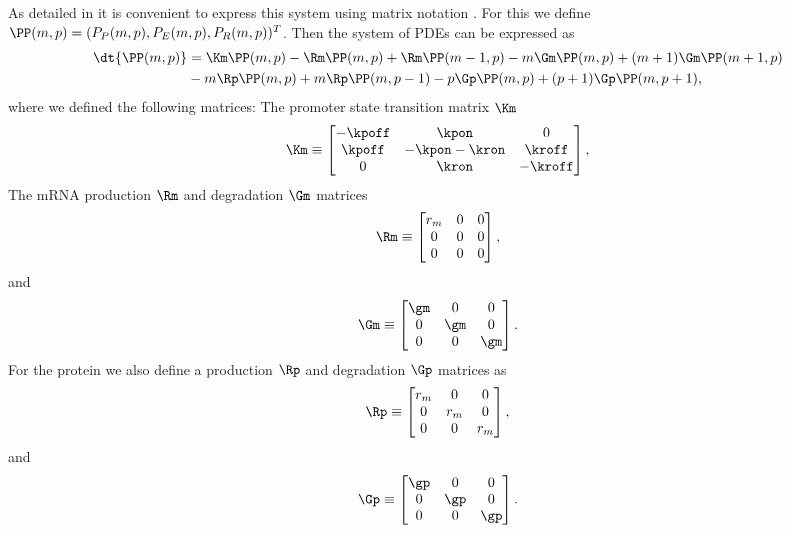 As detailed in  it is convenient to express this system using
matrix notation \cite{Sanchez2013}. For this we define $\PP(m, p) = (P_P(m, p),
P_E(m, p), P_R(m, p))^T$. Then the system of PDEs can be expressed as
\begin{equation}
  \begin{aligned}
    \dt{\PP(m, p)} &= \Km \PP(m, p)
    - \Rm \PP(m, p) + \Rm \PP(m-1, p)
    - m \Gm \PP(m, p) + (m + 1) \Gm \PP(m + 1, p)\\
    &- m \Rp \PP(m, p) + m \Rp \PP(m, p - 1)
    - p \Gp \PP(m, p) + (p + 1) \Gp \PP(m, p + 1),
  \end{aligned}
\end{equation}
where we defined the following matrices: The promoter state transition matrix
$\Km$
\begin{align}
  \Km \equiv
  \begin{bmatrix}
    -\kpoff   & \kpon         & 0\\
    \kpoff    & -\kpon -\kron  & \kroff\\
    0         & \kron         & -\kroff
  \end{bmatrix},
\end{align}
The mRNA production $\Rm$ and degradation $\Gm$ matrices
\begin{equation}
  \Rm \equiv
  \begin{bmatrix}
    r_m   & 0 & 0\\
    0     & 0 & 0\\
    0     & 0 & 0\\
  \end{bmatrix},
\end{equation}
and
\begin{equation}
  \Gm \equiv
  \begin{bmatrix}
    \gm   & 0   & 0\\
    0     & \gm & 0\\
    0     & 0   & \gm\\
  \end{bmatrix}.
\end{equation}
For the protein we also define a production $\Rp$ and degradation $\Gp$ matrices
as
\begin{equation}
  \Rp \equiv
  \begin{bmatrix}
    r_m   & 0   & 0\\
    0     & r_m & 0\\
    0     & 0   & r_m\\
  \end{bmatrix},
\end{equation}
and
\begin{equation}
  \Gp \equiv
  \begin{bmatrix}
    \gp   & 0   & 0\\
    0     & \gp & 0\\
    0     & 0   & \gp\\
  \end{bmatrix}.
\end{equation}

